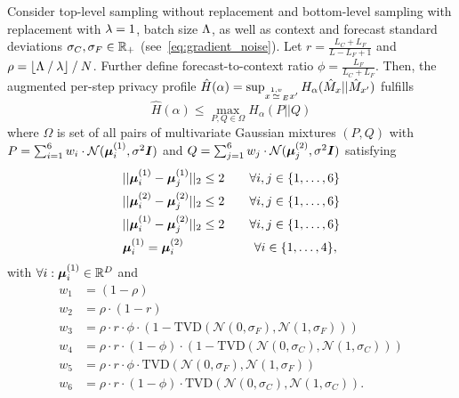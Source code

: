 \begin{lemma}\label{lemma:reduction_via_maximal_coupling}
    Consider top-level sampling without replacement and bottom-level sampling with replacement with $\lambda = 1$, 
    batch size $\Lambda$, as well as context and forecast standard deviations $\sigma_C, \sigma_F \in {\mathbb{R}}_+$ 
    (see~\cref{eq:gradient_noise}). 
    Let $r = \frac{L_C + L_F}{L - L_F + 1}$ and  
    $\rho = \lfloor \Lambda \mathbin{/} \lambda \rfloor \mathbin{/} N$.
    Further define forecast-to-context ratio $\phi = \frac{L_F}{L_C + L_F}$. 
    Then, the augmented per-step privacy profile $\hat{H}(\alpha) = \sup_{x \overset{1,v}{\simeq}_{E} x'} H_\alpha(\hat{M}_x || \hat{M}_{x'})$ fulfills 
    \begin{equation}\label{eq:data_augmentation_objective}
        \hat{H}(\alpha) \leq \max_{P, Q \in \Omega} H_\alpha(P || Q)
    \end{equation}
    where $\Omega$ is set of all pairs of multivariate Gaussian mixtures $(P,Q)$
    with 
    $P = \sum_{i=1}^{6} w_i \cdot \mathcal{N}({\bm{\mu}}^{(1)}_{i}, \sigma^2 {\bm{I}})$
    and
    $Q = \sum_{j=1}^{6} w_j \cdot \mathcal{N}({\bm{\mu}}^{(2)}_{j}, \sigma^2 {\bm{I}})$
    satisfying
    \begin{align}
        \begin{split}\label{eq:data_augmentation_constraints}
        & ||\vmu^{(1)}_i - \vmu^{(1)}_j||_2 \leq 2    \qquad \forall i,j \in \{1,\dots,6\} \\
        & ||\vmu^{(2)}_i - \vmu^{(2)}_j||_2 \leq 2    \qquad  \forall i,j \in \{1,\dots,6\}\\
        & ||\vmu^{(1)}_i - \vmu^{(2)}_j||_2 \leq 2   \qquad \forall i,j \in \{1,\dots,6\} \\
        & \vmu^{(1)}_i = \vmu^{(2)}_i  \qquad \qquad  \quad \ \ \forall i \in \{1,\dots,4\}, 
        \end{split}
    \end{align}
    with $\forall i  : {\bm{\mu}}^{(1)}_i \in {\mathbb{R}}^D$ and
    \begin{align*}
        w_1 & = (1 - \rho) \\
        w_2 & = \rho \cdot (1 - r) \\
        w_3 & = \rho \cdot r \cdot \phi \cdot (1 - \mathrm{TVD}\left(\mathcal{N}(0,\sigma_F), \mathcal{N}(1,\sigma_F)\right)) \\
        w_4 & = \rho \cdot r \cdot (1 - \phi) \cdot (1 - \mathrm{TVD}\left(\mathcal{N}(0,\sigma_C), \mathcal{N}(1,\sigma_C)\right)) \\
        w_5 & = \rho \cdot r \cdot \phi \cdot \mathrm{TVD}\left(\mathcal{N}(0,\sigma_F), \mathcal{N}(1,\sigma_F)\right) \\
        w_6 & = \rho \cdot r \cdot (1 - \phi) \cdot \mathrm{TVD}\left(\mathcal{N}(0,\sigma_C), \mathcal{N}(1,\sigma_C)\right).
    \end{align*}
\end{lemma}

